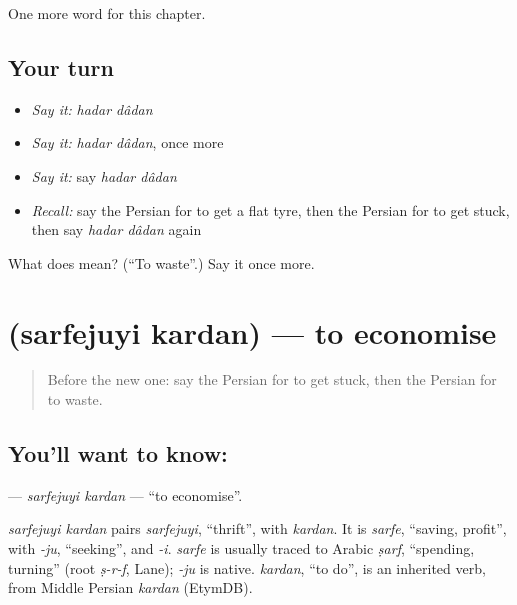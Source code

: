 \begin{grammarlens}[title={What you've built}]
One more word for this chapter.
\end{grammarlens}

\subsection*{Your turn}
\begin{itemize}
\raggedright
  \item \emph{Say it:} \emph{hadar dâdan}
  \item \emph{Say it:} \emph{hadar dâdan}, once more
  \item \emph{Say it:} say \emph{hadar dâdan}
  \item \emph{Recall:} say the Persian for to get a flat tyre, then the Persian for to get stuck, then say \emph{hadar dâdan} again
\end{itemize}

\begin{tcolorbox}[breakable,colback=teal!4,colframe=teal!35!black,title={Before you move on}]
What does   mean? (\textquotedblleft{}To waste\textquotedblright{}.) Say it once more.
\end{tcolorbox}
\section[\texorpdfstring{\fa{صرفه} \fa{جویی} \fa{کردن} (sarfejuyi kardan)}{صرفه جویی کردن (sarfejuyi kardan)}]{   (sarfejuyi kardan) — to economise}

\label{lesson:FA-C149-sarfejuyi-kardan}



\begin{quote}
Before the new one: say the Persian for to get stuck, then the Persian for to waste.
\end{quote}

\subsection*{You'll want to know:   }
\textbf{  } — \emph{sarfejuyi kardan} — \textquotedblleft{}to economise\textquotedblright{}.

\begin{cousinweb}
\emph{sarfejuyi kardan} pairs \emph{sarfejuyi}, \textquotedblleft{}thrift\textquotedblright{}, with \emph{kardan}. It is \emph{sarfe}, \textquotedblleft{}saving, profit\textquotedblright{}, with \emph{-ju}, \textquotedblleft{}seeking\textquotedblright{}, and \emph{-i}. \emph{sarfe} is usually traced to Arabic \emph{ṣarf}, \textquotedblleft{}spending, turning\textquotedblright{} (root \emph{ṣ-r-f}, Lane); \emph{-ju} is native. \emph{kardan}, \textquotedblleft{}to do\textquotedblright{}, is an inherited verb, from Middle Persian \emph{kardan} (EtymDB).
\end{cousinweb}

